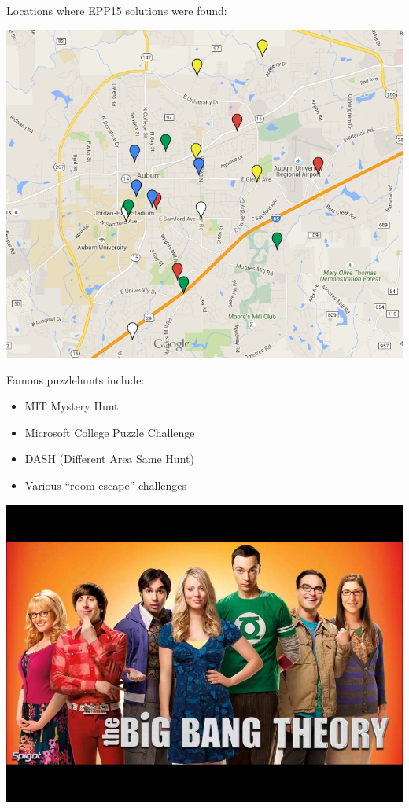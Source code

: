 \documentclass{beamer}
\begin{document}
\begin{frame}
  Locations where EPP15 solutions were found:

  \begin{center}
    \includegraphics[height=0.7\paperheight]
    {epp15map.png}
  \end{center}
\end{frame}

\begin{frame}
  Famous puzzlehunts include:
  \begin{itemize}\small
    \item MIT Mystery Hunt
    \pause
    \item Microsoft College Puzzle Challenge
    \pause
    \item DASH (Different Area Same Hunt)
    \pause
    \item Various ``room escape'' challenges
  \end{itemize}
\end{frame}

\begin{frame}
  \begin{center}\tiny
    \includegraphics[height=0.8\paperheight]
    {the_big_bang_theory.jpg}
  \end{center}
\end{frame}
\end{document}
